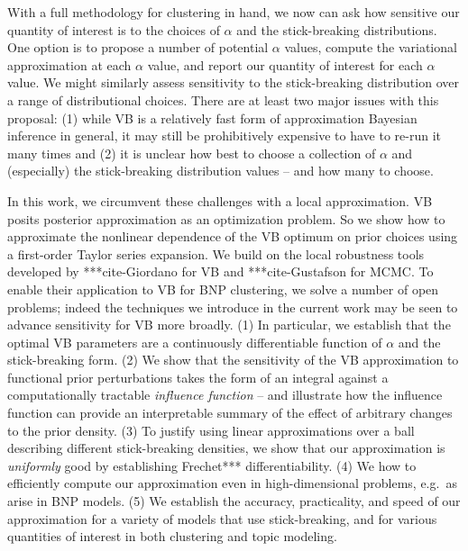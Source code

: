 With a full methodology for clustering in hand, we now can ask how sensitive our quantity of interest is to the choices of $\alpha$ and the stick-breaking distributions. One option is to propose a number of potential $\alpha$ values, compute the variational approximation at each $\alpha$ value, and report our quantity of interest for each $\alpha$ value. We might similarly assess sensitivity to the stick-breaking distribution over a range of distributional choices. There are at least two major issues with this proposal: (1) while VB is a relatively fast form of approximation Bayesian inference in general, it may still be prohibitively expensive to have to re-run it many times and (2) it is unclear how best to choose a collection of $\alpha$ and (especially) the stick-breaking distribution values -- and how many to choose. 

In this work, we circumvent these challenges with a local approximation. VB posits posterior approximation as an optimization problem. So we show how to approximate the nonlinear dependence of the VB optimum on prior choices using a
first-order Taylor series expansion. We build on the local robustness tools developed by ***cite-Giordano for VB and ***cite-Gustafson for MCMC. To enable their application to VB for BNP clustering, we solve a number of open problems; indeed the techniques we introduce in the current work may be seen to advance sensitivity for VB more broadly. (1) In particular, we establish that the optimal VB parameters are a continuously differentiable function of $\alpha$ and the stick-breaking form. (2) We show that the sensitivity
of the VB approximation to functional prior perturbations takes the form of
an integral against a computationally tractable \textit{influence function} -- and illustrate how the influence function can provide an interpretable summary of the effect of arbitrary changes to
the prior density. (3) To justify using linear approximations over a ball describing different stick-breaking densities, we show that our approximation is \textit{uniformly} good by establishing Frechet*** differentiability. (4) We how to efficiently
compute our approximation even in high-dimensional problems, e.g.\ as arise in BNP models. (5) We establish the accuracy, practicality, and speed of our approximation for a variety of models that use stick-breaking, and for various quantities of interest in both clustering and topic modeling.